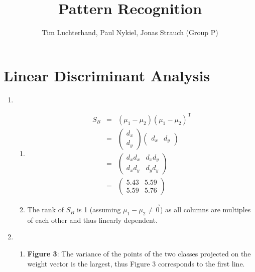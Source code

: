 \documentclass[DIN, pagenumber=false, fontsize=11pt, parskip=half]{scrartcl}
\title{Pattern Recognition}
\author{Tim Luchterhand, Paul Nykiel, Jonas Strauch (Group P)}
\begin{document}
    \maketitle
    \section{Linear Discriminant Analysis}
    \begin{enumerate}
        \item 
            \begin{enumerate}[label=\alph*)]
                \item
                    \begin{eqnarray*}
                        S_B &=& (\mu_1 - \mu_2) {(\mu_1 - \mu_2)}^\text{T} \\
                            &=& 
                                \begin{pmatrix}
                                    d_x \\ d_y
                                \end{pmatrix}
                                \begin{pmatrix}
                                    d_x & d_y
                                \end{pmatrix}\\
                            &=&
                                \begin{pmatrix}
                                    d_x d_x & d_x d_y \\
                                    d_x d_y & d_y d_y
                                \end{pmatrix} \\
                            &=&
                                \begin{pmatrix}
                                    5.43 & 5.59 \\
                                    5.59 & 5.76
                                \end{pmatrix}
                    \end{eqnarray*}
                \item
                    The rank of $S_B$ is 1 (assuming $\mu_1 - \mu_2 \neq \vec{0}$) as all columns are multiples of each other and thus linearly dependent.
            \end{enumerate}
        \item
            \begin{enumerate}[label=\alph*)]
                \item 
                    \textbf{Figure 3}: The variance of the points of the two classes projected on the weight vector is the largest, thus Figure 3 corresponds to the first line.
                    

\end{enumerate}
\end{enumerate}
\end{document}
